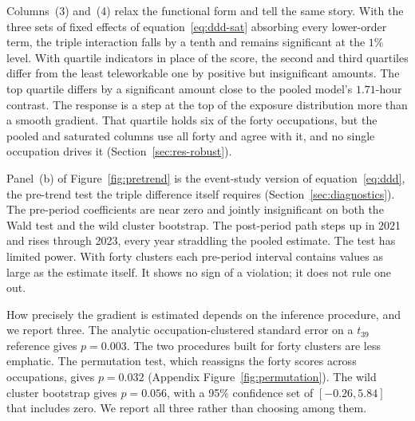 \documentclass[12pt,a4paper]{article}
\begin{document}
\noindent Columns~(3) and~(4) relax the functional form and tell the same story. With the three sets of
fixed effects of equation~\eqref{eq:ddd-sat} absorbing every lower-order term, the triple
interaction falls by a tenth and remains significant at the $1\%$ level. With quartile indicators
in place of the score, the second and third quartiles differ from the least teleworkable one by
positive but insignificant amounts. The top quartile differs by a significant amount close to
the pooled model's $1.71$-hour contrast. The response is a step at the top of the exposure
distribution more than a smooth gradient. That quartile holds six of the forty occupations, but
the pooled and saturated columns use all forty and agree with it, and no single occupation drives
it (Section~\ref{sec:res-robust}).

\noindent Panel~(b) of Figure~\ref{fig:pretrend} is the event-study version of equation~\eqref{eq:ddd}, the
pre-trend test the triple difference itself requires (Section~\ref{sec:diagnostics}). The
pre-period coefficients are near zero and jointly insignificant on both the Wald test and the wild
cluster bootstrap. The post-period path steps up in 2021 and rises through 2023, every year
straddling the pooled estimate. The test has limited power. With forty clusters each pre-period
interval contains values as large as the estimate itself. It shows no sign of a violation; it does
not rule one out.

\noindent How precisely the gradient is estimated depends on the inference procedure, and we report three.
The analytic occupation-clustered standard error on a $t_{39}$ reference gives $p = 0.003$. The
two procedures built for forty clusters are less emphatic. The permutation test, which reassigns
the forty scores across occupations, gives $p = 0.032$ (Appendix Figure~\ref{fig:permutation}).
The wild cluster bootstrap gives $p = 0.056$, with a 95\% confidence set of $[-0.26, 5.84]$ that
includes zero. We report all three rather than choosing among them.
\end{document}
